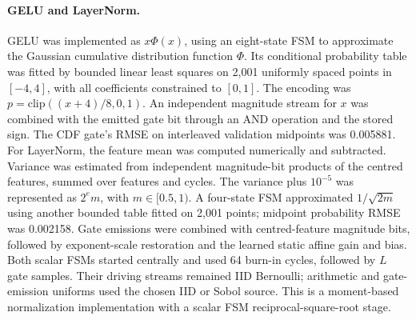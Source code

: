 \paragraph{GELU and LayerNorm.}
GELU was implemented as $x\Phi(x)$, using an eight-state FSM to approximate
the Gaussian cumulative distribution function $\Phi$. Its conditional
probability table was fitted by bounded linear least squares on 2,001
uniformly spaced points in $[-4,4]$, with all coefficients constrained to
$[0,1]$. The encoding was $p=\mathrm{clip}((x+4)/8,0,1)$.
An independent magnitude stream for $x$ was combined with the emitted gate
bit through an AND operation and the stored sign. The CDF gate's RMSE on
interleaved validation midpoints was 0.005881.
For LayerNorm, the feature mean was computed numerically and subtracted.
Variance was estimated from independent magnitude-bit products of the
centred features, summed over features and cycles. The variance plus
$10^{-5}$ was represented as $2^e m$, with $m\in[0.5,1)$.
A four-state FSM approximated $1/\sqrt{2m}$ using another bounded table fitted
on 2,001 points; midpoint probability RMSE was 0.002158. Gate emissions were
combined with centred-feature magnitude bits, followed by exponent-scale
restoration and the learned static affine gain and bias. Both scalar FSMs
started centrally and used 64 burn-in cycles, followed by $L$ gate samples.
Their driving streams remained IID Bernoulli; arithmetic and gate-emission
uniforms used the chosen IID or Sobol source. This is a moment-based
normalization implementation with a scalar FSM reciprocal-square-root stage.

